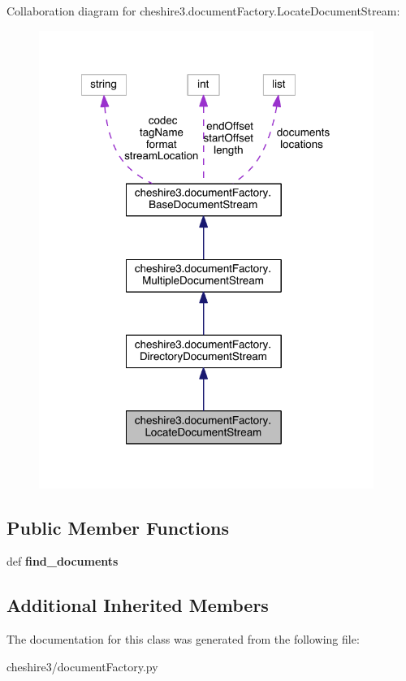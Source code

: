 Collaboration diagram for cheshire3.\-document\-Factory.\-Locate\-Document\-Stream\-:
\nopagebreak
\begin{figure}[H]
\begin{center}
\leavevmode
\includegraphics[width=309pt]{classcheshire3_1_1document_factory_1_1_locate_document_stream__coll__graph}
\end{center}
\end{figure}
\subsection*{Public Member Functions}
\begin{DoxyCompactItemize}
\item 
\hypertarget{classcheshire3_1_1document_factory_1_1_locate_document_stream_a31f028ccde83203d90cb25df64865ef1}{def {\bfseries find\-\_\-documents}}\label{classcheshire3_1_1document_factory_1_1_locate_document_stream_a31f028ccde83203d90cb25df64865ef1}

\end{DoxyCompactItemize}
\subsection*{Additional Inherited Members}


The documentation for this class was generated from the following file\-:\begin{DoxyCompactItemize}
\item 
cheshire3/document\-Factory.\-py\end{DoxyCompactItemize}

